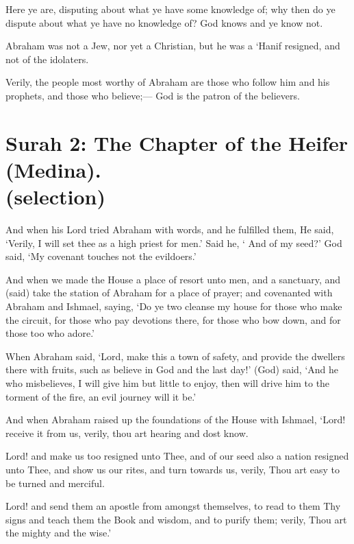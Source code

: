 \documentclass[fontsize=14pt, letterpaper, notitlepage, openany, DIV=12]{scrbook} %
\begin{document}
\noindent[3:66]
Here ye are, disputing about what ye have some knowledge of; why then do ye dispute
about what ye have no knowledge of? God knows and ye know not.

\noindent[3:67]
Abraham was not a Jew, nor yet a Christian, but he was a `Hanif resigned, and not of the
idolaters.

\noindent[3:68]
Verily, the people most worthy of Abraham are those who follow him and his prophets,
and those who believe;--- God is the patron of the believers.


\section[Surah 2: The Chapter of the Heifer (Medina).]{Surah 2: The Chapter of the Heifer (Medina).\\ (selection)}


\noindent[2:124]
And when his Lord tried Abraham with words, and he fulfilled them, He said, `Verily, I
will set thee as a high priest for men.' Said he, ` And of my seed?' God said, `My covenant
touches not the evildoers.'

\noindent[2:125]
And when we made the House a place of resort unto men, and a sanctuary, and (said)
take the station of Abraham for a place of prayer; and covenanted with Abraham and Ishmael,
saying, `Do ye two cleanse my house for those who make the circuit, for those who pay
devotions there, for those who bow down, and for those too who adore.'

\noindent[2:126]
When Abraham said, `Lord, make this a town of safety, and provide the dwellers there
with fruits, such as believe in God and the last day!' (God) said, `And he who misbelieves, I will
give him but little to enjoy, then will drive him to the torment of the fire, an evil journey will it
be.'

\noindent[2:127]
And when Abraham raised up the foundations of the House with Ishmael, `Lord! receive
it from us, verily, thou art hearing and dost know.

\noindent[2:128]
Lord! and make us too resigned unto Thee, and of our seed also a nation resigned unto
Thee, and show us our rites, and turn towards us, verily, Thou art easy to be turned and merciful.

\noindent[2:129]
Lord! and send them an apostle from amongst themselves, to read to them Thy signs and
teach them the Book and wisdom, and to purify them; verily, Thou art the mighty and the wise.'
\end{document}

